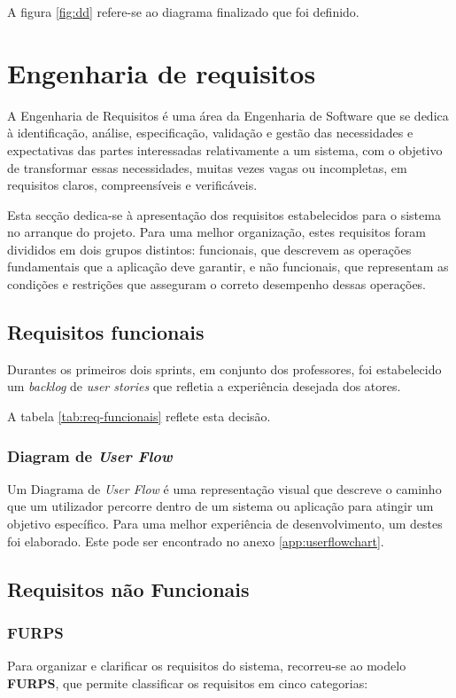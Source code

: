 A figura \ref{fig:dd} refere-se ao diagrama finalizado que foi definido.

\section{Engenharia de requisitos}

A Engenharia de Requisitos é uma área da Engenharia de Software que se dedica à identificação, análise, especificação, validação e gestão das necessidades e expectativas das partes interessadas relativamente a um sistema, com o objetivo de transformar essas necessidades, muitas vezes vagas ou incompletas, em requisitos claros, compreensíveis e verificáveis.

Esta secção dedica-se à apresentação dos requisitos estabelecidos para o sistema no arranque do projeto. 
Para uma melhor organização, estes requisitos foram divididos em dois grupos distintos: funcionais, que descrevem as operações fundamentais que a aplicação deve garantir, e não funcionais, que representam as condições e restrições que asseguram o correto desempenho dessas operações.


\subsection{Requisitos funcionais}
\label{subsection:requisitos_funcionais}

Durantes os primeiros dois sprints, em conjunto dos professores, foi estabelecido um \textit{backlog} de \textit{user stories} que refletia a experiência desejada dos atores. 

A tabela \ref{tab:req-funcionais} reflete esta decisão.
\subsubsection{Diagram de \textit{User Flow}}

Um Diagrama de \textit{User Flow} é uma representação visual que descreve o caminho que um utilizador percorre dentro de um sistema ou aplicação para atingir um objetivo específico. Para uma melhor experiência de desenvolvimento, um destes foi elaborado. Este pode ser encontrado no anexo \ref{app:userflowchart}.    

\subsection{Requisitos não Funcionais}

\subsubsection{FURPS}
Para organizar e clarificar os requisitos do sistema, recorreu-se ao modelo \textbf{FURPS}, que permite classificar os requisitos em cinco categorias: 

